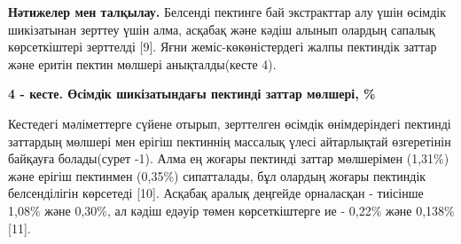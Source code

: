 
{\bfseries Нәтижелер мен талқылау.} Белсенді пектинге бай экстракттар алу
үшін өсімдік шикізатынан зерттеу үшін алма, асқабақ және кәдіш алынып
олардың сапалық көрсеткіштері зерттелді {[}9{]}. Яғни
жеміс-көкөністердегі жалпы пектиндік заттар және еритін пектин мөлшері
анықталды(кесте 4).

{\bfseries 4 - кесте. Өсімдік шикізатындағы пектинді заттар мөлшері, \%}


Кестедегі мәліметтерге сүйене отырып, зерттелген өсімдік өнімдеріндегі
пектинді заттардың мөлшері мен ерігіш пектиннің массалық үлесі
айтарлықтай өзгеретінін байқауға болады(сурет -1). Алма ең жоғары
пектинді заттар мөлшерімен (1,31\%) және ерігіш пектинмен (0,35\%)
сипатталады, бұл олардың жоғары пектиндік белсенділігін көрсетеді
{[}10{]}. Асқабақ аралық деңгейде орналасқан - тиісінше 1,08\% және
0,30\%, ал кәдіш едәуір төмен көрсеткіштерге ие - 0,22\% және 0,138\%
{[}11{]}.

